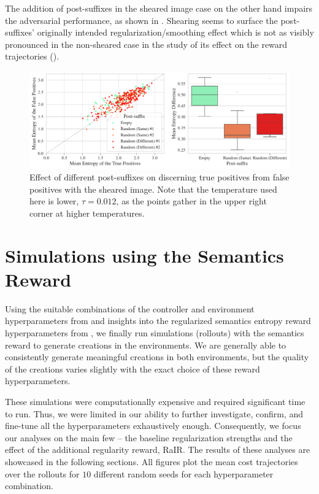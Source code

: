 The addition of post-suffixes in the sheared image case on the other hand impairs the adversarial performance, as shown in .
Shearing seems to surface the post-suffixes' originally intended regularization/smoothing effect which is not as visibly pronounced in the non-sheared case in the study of its effect on the reward trajectories ().

\begin{figure}[H]
    \centering
    \includegraphics[width=\textwidth]{images/post-suffix_sheared_adversarial_12.pdf}
    \caption[Effect of different post-suffixes on discerning true positives from false positives with sheared images.]{Effect of different post-suffixes on discerning true positives from false positives with the sheared image. Note that the temperature used here is lower, \(\tau = 0.012\), as the points gather in the upper right corner at higher temperatures.}
    \label{fig:post-suffix_sheared_adversarial}
\end{figure}

\section{Simulations using the Semantics Reward}
\label{sec:simulations}

Using the suitable combinations of the controller and environment hyperparameters from  and insights into the regularized semantics entropy reward hyperparameters from , we finally run simulations (rollouts) with the semantics reward to generate creations in the environments.
We are generally able to consistently generate meaningful creations in both environments, but the quality of the creations varies slightly with the exact choice of these reward hyperparameters.

These simulations were computationally expensive and required significant time to run.
Thus, we were limited in our ability to further investigate, confirm, and fine-tune all the hyperparameters exhaustively enough. 
Consequently, we focus our analyses on the main few -- the baseline regularization strengths and the effect of the additional regularity reward, RaIR.
The results of these analyses are showcased in the following sections.
All figures plot the mean cost trajectories over the rollouts for \(10\) different random seeds for each hyperparameter combination.

